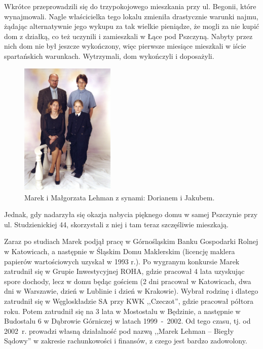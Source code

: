 Wkrótce przeprowadzili się do trzypokojowego mieszkania przy ul. Begonii, które wynajmowali. Nagle właścicielka tego lokalu zmieniła drastycznie warunki najmu, żądając alternatywnie jego wykupu za tak wielkie pieniądze, że mogli za nie kupić dom z działką, co też uczynili i zamieszkali w Łące pod Pszczyną. Nabyty przez nich dom nie był jeszcze wykończony, więc pierwsze miesiące mieszkali w iście spartańskich warunkach. Wytrzymali, dom wykończyli i doposażyli.

\begin{figure}[!h]
\begin{center}
\includegraphics[width=0.4\textwidth]{photo/marek_malgorzata_lehman_z_dziecmi.jpg}
\caption{Marek i Małgorzata Lehman z synami: Dorianem i Jakubem.}
\end{center}
\end{figure}

Jednak, gdy nadarzyła się okazja  nabycia pięknego domu w samej Pszczynie przy ul. Studzienickiej 44, skorzystali z niej i tam teraz szczęśliwie mieszkają.

Zaraz po studiach Marek podjął pracę w Górnośląskim Banku Gospodarki Rolnej w Katowicach, a następnie w Śląskim Domu Maklerskim (licencję maklera papierów wartościowych uzyskał w 1993 r.). Po wygranym konkursie Marek zatrudnił się w Grupie Inwestycyjnej ROHA, gdzie pracował 4 lata uzyskując spore dochody, lecz w domu będąc gościem (2 dni pracował w Katowicach, dwa dni w Warszawie, dzień w Lublinie i dzień w Krakowie). Wybrał rodzinę i dlatego zatrudnił się w Węgloskładzie SA przy KWK ,,Czeczot'', gdzie pracował półtora roku. Potem zatrudnił się na 3 lata w Mostostalu w Będzinie, a następnie w Budostalu 6 w Dąbrowie Górniczej w latach 1999~-~2002. Od tego czasu, tj. od 2002~r. prowadzi własną działalność pod nazwą ,,Marek Lehman -- Biegły Sądowy'' w zakresie rachunkowości i finansów, z czego jest bardzo zadowolony.


